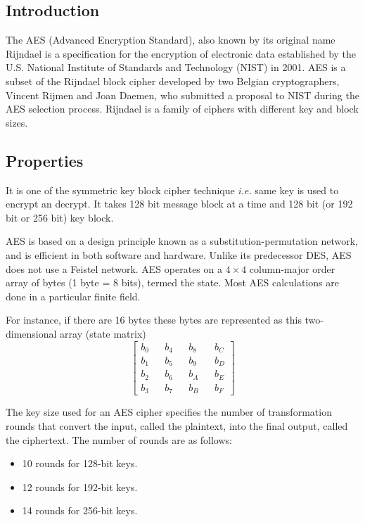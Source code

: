 \subsection{Introduction}
The AES (Advanced Encryption Standard), also known by its original name Rijndael  is a specification for the encryption of electronic data established by the U.S. National Institute of Standards and Technology (NIST) in 2001. AES is a subset of the Rijndael block cipher developed by two Belgian cryptographers, Vincent Rijmen and Joan Daemen, who submitted a proposal to NIST during the AES selection process. Rijndael is a family of ciphers with different key and block sizes.

\subsection{Properties}
It is one of the symmetric key block cipher technique \textit{i.e.} same key is used to encrypt an decrypt. It takes 128 bit message block at a time and 128 bit (or 192 bit or 256 bit) key block.

AES is based on a design principle known as a substitution-permutation network, and is efficient in both software and hardware. Unlike its predecessor DES, AES does not use a Feistel network. AES operates on a $4 \times 4$ column-major order array of bytes (1 byte = 8 bits), termed the state. Most AES calculations are done in a particular finite field.

For instance, if there are 16 bytes these bytes are represented as this two-dimensional array (state matrix) \\
$$
\begin{bmatrix}
b_0 && b_4 && b_8 && b_C \\
b_1 && b_5 && b_9 && b_D \\
b_2 && b_6 && b_A && b_E \\
b_3 && b_7 && b_B && b_F
\end{bmatrix}
$$

The key size used for an AES cipher specifies the number of transformation rounds that convert the input, called the plaintext, into the final output, called the ciphertext. The number of rounds are as follows:
\begin{itemize}
\item 10 rounds for 128-bit keys.
\item 12 rounds for 192-bit keys.
\item 14 rounds for 256-bit keys.
\end{itemize}

